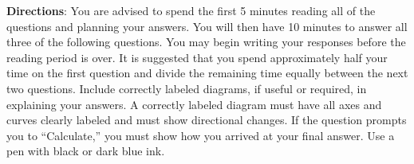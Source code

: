 \noindent\textbf{Directions}: You are advised to spend the first 5 minutes
reading all of the questions and planning your answers. You will then
have 10 minutes to answer all three of the following questions. You may
begin writing your responses before the reading period is over. It is
suggested that you spend approximately half your time on the first
question and divide the remaining time equally between the next two
questions. Include correctly labeled diagrams, if useful or required, in
explaining your answers. A correctly labeled diagram must have all axes
and curves clearly labeled and must show directional changes. If the
question prompts you to “Calculate,” you must show how you arrived at
your final answer. Use a pen with black or dark blue ink. \\

\clearpage


